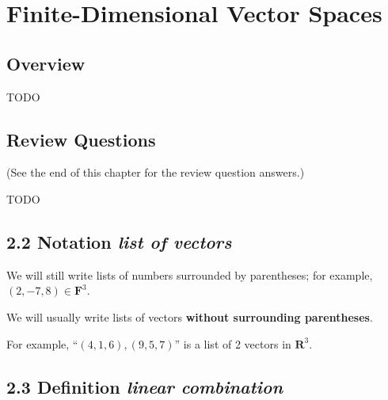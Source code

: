 \documentclass[12pt, letterpaper, oneside]{book}
\begin{document}
%
%

\chapter{Finite-Dimensional Vector Spaces}

\section{Overview}

TODO

\section{Review Questions}

(See the end of this chapter for the review question answers.)

TODO

\section{2.2 Notation \textbf{\textit{list of vectors}}}

We will still write lists of numbers surrounded by parentheses; for example,
$(2, -7, 8) \in \mathbf{F}^3$.

We will usually write lists of vectors \textbf{without surrounding parentheses}.

For example, ``$(4, 1, 6), (9, 5, 7)$'' is a list of 2 vectors in
$\mathbf{R}^3$.

\section{2.3 Definition \textbf{\textit{linear combination}}}
\end{document}
